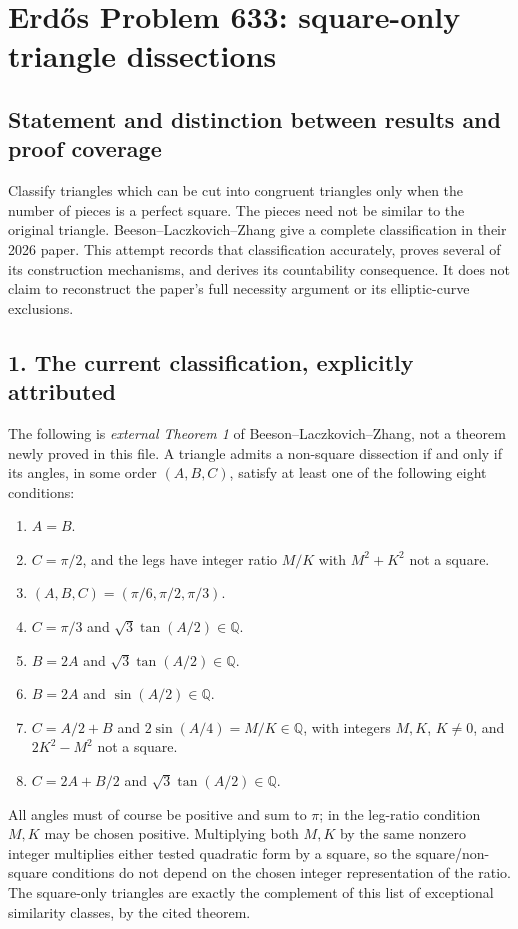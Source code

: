 \section{Erd\H{o}s Problem 633: square-only triangle dissections}
\subsection*{Statement and distinction between results and proof coverage}
Classify triangles which can be cut into congruent triangles only when the number of pieces is a perfect square. The pieces need not be similar to the original triangle. Beeson--Laczkovich--Zhang give a complete classification in their 2026 paper. This attempt records that classification accurately, proves several of its construction mechanisms, and derives its countability consequence. It does not claim to reconstruct the paper's full necessity argument or its elliptic-curve exclusions.

\subsection*{1. The current classification, explicitly attributed}
The following is \emph{external Theorem 1} of Beeson--Laczkovich--Zhang, not a theorem newly proved in this file. A triangle admits a non-square dissection if and only if its angles, in some order $(A,B,C)$, satisfy at least one of the following eight conditions:
\begin{enumerate}
\item $A=B$.
\item $C=\pi/2$, and the legs have integer ratio $M/K$ with $M^2+K^2$ not a square.
\item $(A,B,C)=(\pi/6,\pi/2,\pi/3)$.
\item $C=\pi/3$ and $\sqrt3\tan(A/2)\in\mathbb Q$.
\item $B=2A$ and $\sqrt3\tan(A/2)\in\mathbb Q$.
\item $B=2A$ and $\sin(A/2)\in\mathbb Q$.
\item $C=A/2+B$ and $2\sin(A/4)=M/K\in\mathbb Q$, with integers $M,K$, $K\ne0$, and $2K^2-M^2$ not a square.
\item $C=2A+B/2$ and $\sqrt3\tan(A/2)\in\mathbb Q$.
\end{enumerate}
All angles must of course be positive and sum to $\pi$; in the leg-ratio condition $M,K$ may be chosen positive. Multiplying both $M,K$ by the same nonzero integer multiplies either tested quadratic form by a square, so the square/non-square conditions do not depend on the chosen integer representation of the ratio. The square-only triangles are exactly the complement of this list of exceptional similarity classes, by the cited theorem.


